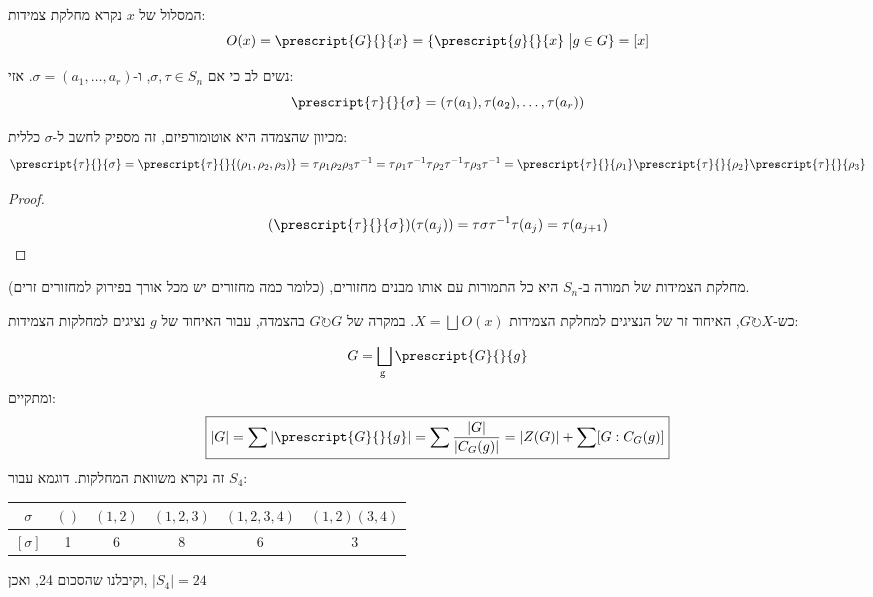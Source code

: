 \documentclass{tstextbook}
\begin{document}
\begin{definition}
המסלול של \(x\) נקרא מחלקת צמידות:
$$O(x)=\prescript{G}{}{x}=\{ \prescript{g}{}{x} \;\big|g \in G \}=[x]$$

\end{definition}
\begin{remark}
נשים לב כי אם \(\sigma,\tau \in S_{n}\), ו-\(\sigma=(a_{1},\dots,a_{r})\). אזי:
$$\prescript{\tau}{}{\sigma}=(\tau(a_{1}), \tau(a_{2}), \dots, \tau(a_{r}))$$

\end{remark}
\begin{remark}
מכיוון שהצמדה היא אוטומורפיזם, זה מספיק לחשב ל-\(\sigma\) כללית:
$$\prescript{\tau}{}{\sigma}=\prescript{\tau}{}{(\rho_{1},\rho_{2},\rho_{3})}=\tau \rho_{1}\rho_{2}\rho_{3}\tau ^{-1} =\tau \rho_{1}\tau ^{-1} \tau \rho_{2}\tau ^{-1} \tau \rho_{3}\tau ^{-1} =\prescript{\tau}{}{\rho_{1}}\prescript{\tau}{}{\rho_{2}}\prescript{\tau}{}{\rho_{3}}$$

\end{remark}
\begin{proof}
$$(\prescript{\tau}{}{\sigma})(\tau(a_{j}))=\tau \sigma \tau ^{-1} \tau(a_{j})=\tau(a_{j+1})$$

\end{proof}
\begin{corollary}
מחלקת הצמידות של תמורה ב-\(S_{n}\) היא כל התמורות עם אותו מבנים מחזורים, (כלומר כמה מחזורים יש מכל אורך בפירוק למחזורים זרים).

\end{corollary}
כש-\(G\circlearrowright X\), האיחוד זר של הנציגים למחלקת הצמידות   \(X=\bigsqcup_{}^{}O(x)\). במקרה של \(G\circlearrowright G\) בהצמדה, עבור האיחוד של \(g\) נציגים למחלקות הצמידות:
$$G=\bigsqcup_{\text{g }}^{} \prescript{G}{}{g}$$
ומתקיים:
$$\boxed{|G|=\sum|\prescript{G}{}{g}|=\sum \frac{|G|}{|C_{G}(g)|}=|Z(G)|+\sum[G:C_{G}(g)]}
$$
זה נקרא משוואת המחלקות.
דוגמא עבור \(S_{4}\):

\begin{table}[htbp]
  \centering
  \begin{tabular}{|cccccc|}
    \hline
    \(\sigma\) & \(()\) & \((1,2)\) & \((1,2,3)\) & \((1,2,3,4)\) & \((1,2)(3,4)\) \\ \hline
    \([\sigma]\) & 1 & 6 & 8 & 6 & 3 \\ \hline
  \end{tabular}
\end{table}
וקיבלנו שהסכום 24, ואכן, \(|S_{4}|=24\)
\end{document}
